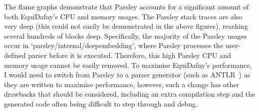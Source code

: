 The flame graphs demonstrate that Parsley accounts for a significant amount of both EquiDafny's CPU and memory usages. The Parsley stack traces are also very deep (this could not easily be demonstrated in the above figures), reaching several hundreds of blocks deep. Specifically, the majority of the Parsley usages occur in `parsley/internal/deepembedding', where Parsley processes the user-defined parser before it is executed. Therefore, this high Parsley CPU and memory usage cannot be easily removed. To maximise EquiDafny's performance, I would need to switch from Parsley to a parser generator (such as ANTLR~\parencite{DefinitiveANTLR4}) as they are written to maximise performance, however, such a change has other drawbacks that should be considered, including an extra compilation step and the generated code often being difficult to step through and debug.  